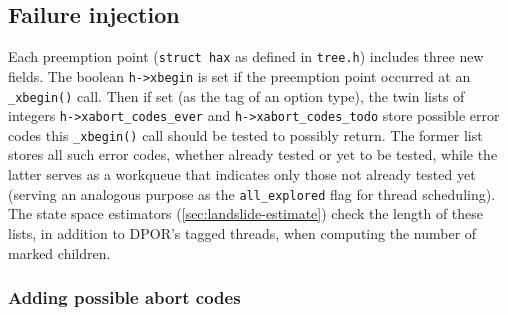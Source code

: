 \subsection{Failure injection}
\label{sec:txn-failure}

Each preemption point ({\tt struct hax} as defined in {\tt tree.h})
includes three new fields.
The boolean {\tt h->xbegin} is set if the preemption point occurred at an {\tt \_xbegin()} call.
Then if set (as the tag of an option type),
the twin lists of integers
{\tt h->xabort\_codes\_ever}
and
{\tt h->xabort\_codes\_todo}
store possible error codes this {\tt \_xbegin()} call should be tested to possibly return.
The former list stores all such error codes, whether already tested or yet to be tested,
while the latter serves as a workqueue that indicates only those not already tested yet
(serving an analogous purpose as the {\tt all\_explored} flag for thread scheduling).
The state space estimators (\cref{sec:landslide-estimate})
check the length of these lists, in addition to DPOR's tagged threads,
when computing the number of marked children.

\subsubsection{Adding possible abort codes}
\label{sec:txn-abort-codes}

